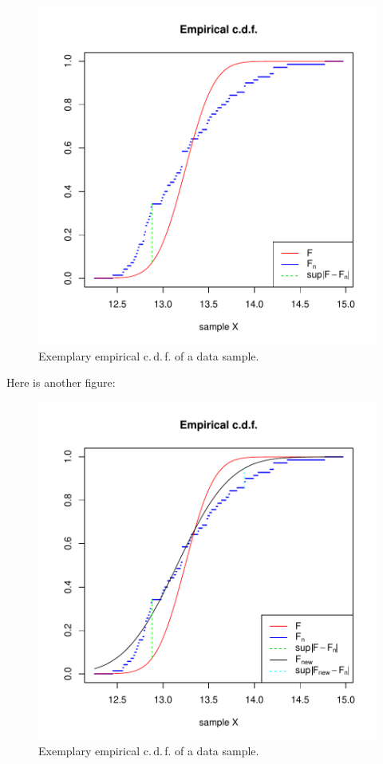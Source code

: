 \documentclass[a4paper, 12pt, titlepage, headsepline, listof = totoc, bibliography = totoc, numbers = noenddot]{scrartcl}
\newcommand{\cdf}{c.\,d.\,f. }
\begin{document}
\begin{figure}[h!]
\includegraphics[width=\textwidth]{report-empiricTeorFunc}
\caption{Exemplary empirical \cdf of a data sample.}
\label{fig:empiricTeorFunc}
\end{figure}

Here is another figure:

\begin{figure}[h!]
\includegraphics[width=\textwidth]{report-improvedKS}
\caption{Exemplary empirical \cdf of a data sample.}
\label{fig:improvedKS}
\end{figure}
\end{document}
